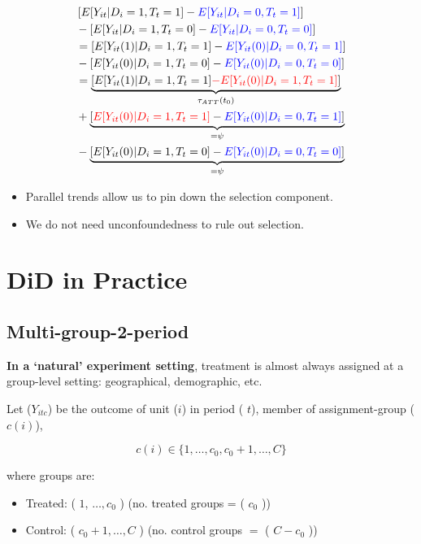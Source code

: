 \documentclass[
  letterpaper,
  DIV=11,
  numbers=noendperiod]{scrreprt}
\providecommand{\tightlist}{%
  \setlength{\itemsep}{0pt}\setlength{\parskip}{0pt}}\usepackage{longtable,booktabs,array}
\theoremstyle{definition}
\theoremstyle{remark}
\begin{document}
\[
\begin{aligned}
&\left[E[Y_{it}|D_i=1,T_t=1] - \textcolor{blue}{E[Y_{it}|D_i=0,T_t=1]}\right] \\
&- \left[E[Y_{it}|D_i=1,T_t=0] - \textcolor{blue}{E[Y_{it}|D_i=0,T_t=0]}\right] \\
&= \left[E[Y_{it}(1)|D_i=1,T_t=1] - \textcolor{blue}{E[Y_{it}(0)|D_i=0,T_t=1]}\right] \\
&- \left[E[Y_{it}(0)|D_i=1,T_t=0] - \textcolor{blue}{E[Y_{it}(0)|D_i=0,T_t=0]}\right] \\
&= \underbrace{\left[E[Y_{it}(1)|D_i=1,T_t=1] \textcolor{red}{- E[Y_{it}(0)|D_i=1,T_t=1]}\right]}_{\tau_{ATT}(t_0)} \\
&+ \underbrace{\left[\textcolor{red}{E[Y_{it}(0)|D_i=1,T_t=1]} - \textcolor{blue}{E[Y_{it}(0)|D_i=0,T_t=1]}\right]}_{= \psi} \\
&- \underbrace{\left[E[Y_{it}(0)|D_i=1,T_t=0] - \textcolor{blue}{E[Y_{it}(0)|D_i=0,T_t=0]}\right]}_{= \psi}
\end{aligned}
\]

\begin{itemize}
\tightlist
\item
  Parallel trends allow us to pin down the selection component.
\item
  We do not need unconfoundedness to rule out selection.
\end{itemize}

\hypertarget{did-in-practice}{%
\section{DiD in Practice}\label{did-in-practice}}

\hypertarget{multi-group-2-period}{%
\subsection{Multi-group-2-period}\label{multi-group-2-period}}

\textbf{In a `natural' experiment setting}, treatment is almost always
assigned at a group-level setting: geographical, demographic, etc.

Let (\(Y_{itc}\)) be the outcome of unit (\(i\)) in period ( \(t\)),
member of assignment-group (\(c(i)\)),

\[
c(i) \in \{1, \ldots, c_0, c_0 + 1, \ldots, C\}
\]

where groups are:

\begin{itemize}
\tightlist
\item
  Treated: ( \(1\), \(\ldots, c_0\) ) (no. treated groups = ( \(c_0\) ))
\item
  Control: ( \(c_0 + 1, \ldots, C\) ) (no. control groups \(=\) (
  \(C - c_0\) ))
\end{itemize}
\end{document}
